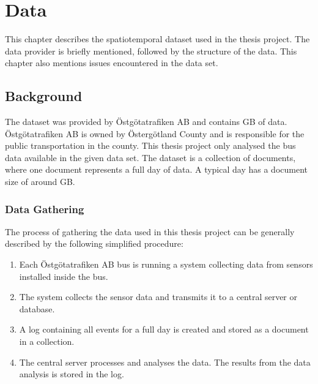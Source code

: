 \chapter{Data}
\label{cha:data}

This chapter describes the spatiotemporal dataset used in the thesis project.
The data provider is briefly mentioned, followed by the structure of the data.
This chapter also mentions issues encountered in the data set.

\section{Background}
The dataset was provided by Östgötatrafiken AB and contains GB of data.
Östgötatrafiken AB is owned by Östergötland County and is responsible for the public transportation in the county.
This thesis project only analysed the bus data available in the given data set.
The dataset is a collection of documents, where one document represents a full day of data.
A typical day has a document size of around GB.

\subsection{Data Gathering}
The process of gathering the data used in this thesis project can be generally described by the following simplified procedure:
\begin{enumerate}
    \item Each Östgötatrafiken AB bus is running a system collecting data from sensors installed inside the bus.
    \item The system collects the sensor data and transmits it to a central server or database.
    \item A log containing all events for a full day is created and stored as a document in a collection.
    \item The central server processes and analyses the data. The results from the data analysis is stored in the log.
\end{enumerate}

